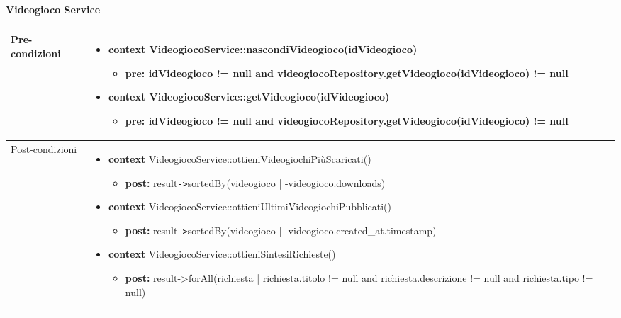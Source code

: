 \paragraph{Videogioco Service}
\small\begin{tabular}{|| l | p{28em} ||} 
	\hline
	Pre-condizioni & \begin{itemize}[leftmargin=*]
		\item \textbf{context} VideogiocoService::nascondiVideogioco(idVideogioco)
		\begin{itemize}
			\item[ ] \textbf{pre:} idVideogioco != null and videogiocoRepository.getVideogioco(idVideogioco) != null
		\end{itemize}

		\item \textbf{context} VideogiocoService::getVideogioco(idVideogioco)
		\begin{itemize}
			\item[ ] \textbf{pre:} idVideogioco != null and videogiocoRepository.getVideogioco(idVideogioco) != null
		\end{itemize}
	\end{itemize}\\
	\hline
	Post-condizioni & \begin{itemize}[leftmargin=*]
		\item \textbf{context} VideogiocoService::ottieniVideogiochiPiùScaricati()
		\begin{itemize}
			\item[ ] \textbf{post:} result\verb|->|sortedBy(videogioco | -videogioco.downloads)
		\end{itemize}

		\item \textbf{context} VideogiocoService::ottieniUltimiVideogiochiPubblicati()
		\begin{itemize}
			\item[ ] \textbf{post:} result\verb|->|sortedBy(videogioco | -videogioco.created\_at.timestamp)
		\end{itemize}

		\item \textbf{context} VideogiocoService::ottieniSintesiRichieste()
		\begin{itemize}
			\item[ ] \textbf{post:} result->forAll(richiesta | richiesta.titolo != null and richiesta.descrizione != null and richiesta.tipo != null)
		\end{itemize}


\end{itemize}
\end{tabular}
